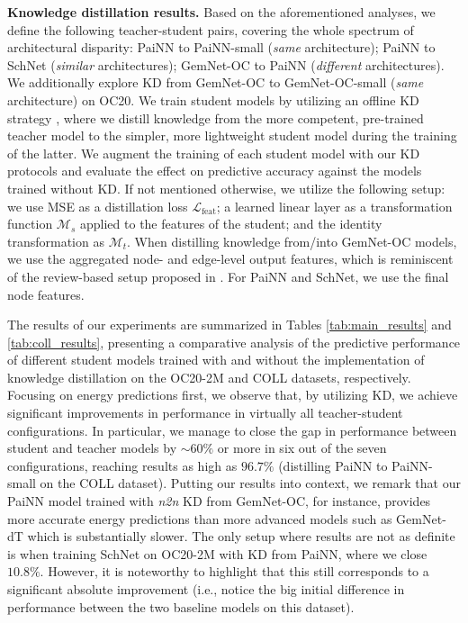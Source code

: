 \documentclass{article}
\newcommand{\loss}{\mathcal{L}}
\begin{document}
\textbf{Knowledge distillation results.}
Based on the aforementioned analyses, we define the following teacher-student pairs, covering the whole spectrum of architectural disparity: PaiNN to PaiNN-small (\emph{same} architecture); PaiNN to SchNet (\emph{similar} architectures); GemNet-OC to PaiNN (\emph{different} architectures). We additionally explore KD from GemNet-OC to GemNet-OC-small (\emph{same} architecture) on OC20. We train student models by utilizing an offline KD strategy \cite{gou2021knowledge}, where we distill knowledge from the more competent, pre-trained teacher model to the simpler, more lightweight student model during the training of the latter. We augment the training of each student model with our KD protocols and evaluate the effect on predictive accuracy against the models trained without KD. 
If not mentioned otherwise, we utilize the following setup: we use MSE as a distillation loss $\loss_{\text{feat}}$; a learned linear layer as a transformation function $\mathcal{M}_s$ applied to the features of the student; and the identity transformation as $\mathcal{M}_t$. When distilling knowledge from/into GemNet-OC models, we use the aggregated node- and edge-level output features, which is reminiscent of the review-based setup proposed in \cite{chen2021distilling}. For PaiNN and SchNet, we use the final node features. 




The results of our experiments are summarized in Tables \ref{tab:main_results} and \ref{tab:coll_results}, presenting a comparative analysis of the predictive performance of different student models trained with and without the implementation of knowledge distillation on the OC20-2M and COLL datasets, respectively. 
% 
Focusing on energy predictions first, we observe that, by utilizing KD, we achieve significant improvements in performance in virtually all teacher-student configurations. In particular, we manage to close the gap in performance between student and teacher models by $\sim60\%$ or more in six out of the seven configurations, reaching results as high as $96.7\%$ (distilling PaiNN to PaiNN-small on the COLL dataset). 
Putting our results into context, we remark that our PaiNN model trained with \emph{n2n} KD from GemNet-OC, for instance, provides more accurate energy predictions than more advanced models such as GemNet-dT \cite{gasteiger_gemnet_2021, gasteiger_gemnet_oc_2022} which is substantially slower.
The only setup where results are not as definite is when training SchNet on OC20-2M with KD from PaiNN, where we close $10.8\%$. However, it is noteworthy to highlight that this still corresponds to a significant absolute improvement (i.e., notice the big initial difference in performance between the two baseline models on this dataset).
\end{document}
